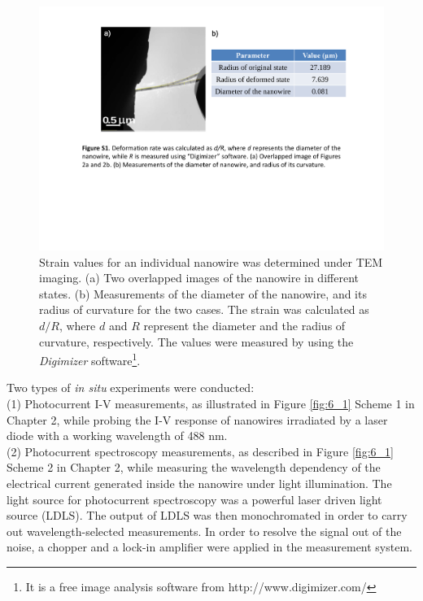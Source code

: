 \begin{figure}  [t]
\centering
\includegraphics[height=\textwidth,angle=-90]{figures/figure6_s2}
\caption[Strain value]
{Strain values for an individual nanowire was determined under TEM imaging. 
(a) Two overlapped images of the nanowire in different states. 
(b) Measurements of the diameter of the nanowire, and its radius of curvature for the two cases. The strain was calculated as $d/R$, where $d$ and $R$ represent the diameter and the radius of curvature, respectively. The values were measured by using the {\em Digimizer} software\footnote{It is a free image analysis software from http://www.digimizer.com/}.
\label{fig:6_s2}}
\end{figure}

Two types of {\it in situ} experiments were conducted:\\
(1) Photocurrent I-V measurements, as illustrated in Figure \ref{fig:6_1} Scheme 1 in Chapter 2, while probing the I-V response of nanowires irradiated by a laser diode with a working wavelength of 488 nm. \\

(2) Photocurrent spectroscopy measurements, as described in Figure \ref{fig:6_1} Scheme 2 in Chapter 2, while measuring the wavelength dependency of the electrical current generated inside the nanowire under light illumination. 
The light source for photocurrent spectroscopy was a powerful laser driven light source (LDLS). The output of LDLS was then monochromated in order to carry out wavelength-selected measurements. 
In order to resolve the signal out of the noise, a chopper and a lock-in amplifier were applied in the measurement system. \\

